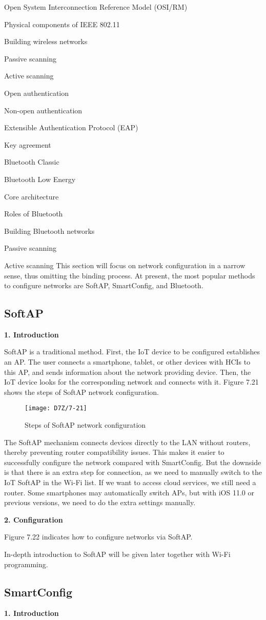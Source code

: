 \documentclass[a4paper,12pt]{book}
\begin{document}
\begin{term}{Open System Interconnection Reference Model (OSI/RM)}
\begin{term}{Physical components of IEEE 802.11}
\begin{term}{Building wireless networks}
\begin{term}{Passive scanning}
\begin{term}{Active scanning}
\begin{term}{Open authentication}
\begin{term}{Non-open authentication}
\begin{term}{Extensible Authentication Protocol (EAP)}
\begin{term}{Key agreement}
\begin{term}{Bluetooth Classic}
\begin{term}{Bluetooth Low Energy}
\begin{term}{Core architecture}
\begin{term}{Roles of Bluetooth}
\begin{term}{Building Bluetooth networks}
\begin{term}{Passive scanning}
\begin{term}{Active scanning}
This section will focus on network configuration in a narrow sense, thus omitting the binding process. At present, the most popular methods to configure networks are SoftAP, SmartConfig, and Bluetooth.

\subsection{SoftAP}
\textbf{1. Introduction}

SoftAP is a traditional method. First, the IoT device to be configured establishes an AP. The user connects a smartphone, tablet, or other devices with HCIs to this AP, and sends information about the network providing device. Then, the IoT device looks for the corresponding network and connects with it. Figure 7.21 shows the steps of SoftAP network configuration.

\begin{figure}[!h]
    \centering
    \texttt{[image: D7Z/7-21]}
    \caption{Steps of SoftAP network configuration}
\end{figure}

The SoftAP mechanism connects devices directly to the LAN without routers, thereby preventing router compatibility issues. This makes it easier to successfully configure the network compared with SmartConfig. But the downside is that there is an extra step for connection, as we need to manually switch to the IoT SoftAP in the Wi-Fi list. If we want to access cloud services, we still need a router. Some smartphones may automatically switch APs, but with iOS 11.0 or previous versions, we need to do the extra settings manually.

\textbf{2. Configuration}

Figure 7.22 indicates how to configure networks via SoftAP.

In-depth introduction to SoftAP will be given later together with Wi-Fi programming.

\subsection{SmartConfig}
\textbf{1. Introduction}


\end{term}
\end{term}
\end{term}
\end{term}
\end{term}
\end{term}
\end{term}
\end{term}
\end{term}
\end{term}
\end{term}
\end{term}
\end{term}
\end{term}
\end{term}
\end{term}
\end{document}
